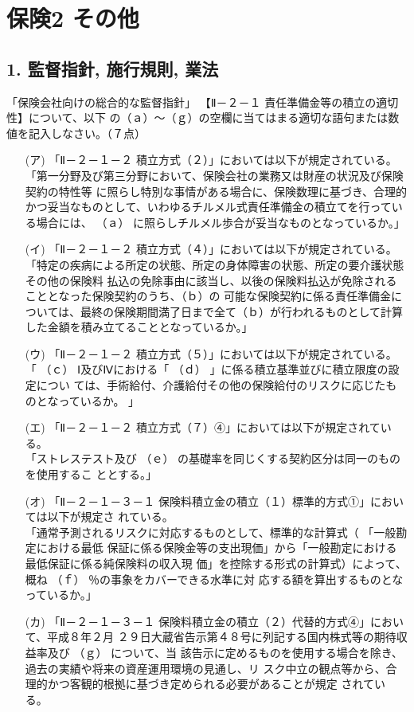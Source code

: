 \documentclass[report,gutter=10mm,fore-edge=10mm,uplatex,dvipdfmx]{jlreq}
\begin{document}
\chapter{保険2 その他}
\section{1. 監督指針, 施行規則, 業法}


「保険会社向けの総合的な監督指針」
【Ⅱ－２－１ 責任準備金等の積立の適切性】について、以下
の（ａ）～（ｇ）の空欄に当てはまる適切な語句または数値を記入しなさい。（７点）

\begin{itemize}
 \item [(ア)]「Ⅱ－２－１－２ 積立方式（２）」においては以下が規定されている。\\
「第一分野及び第三分野において、保険会社の業務又は財産の状況及び保険契約の特性等
に照らし特別な事情がある場合に、保険数理に基づき、合理的かつ妥当なものとして、いわゆるチルメル式責任準備金の積立てを行っている場合には、 （ａ） に照らしチルメル歩合が妥当なものとなっているか。」
 \item [(イ)]「Ⅱ－２－１－２ 積立方式（４）」においては以下が規定されている。\\
「特定の疾病による所定の状態、所定の身体障害の状態、所定の要介護状態その他の保険料
払込の免除事由に該当し、以後の保険料払込が免除されることとなった保険契約のうち、（ｂ）の
可能な保険契約に係る責任準備金については、最終の保険期間満了日まで全て（ｂ）が行われるものとして計算した金額を積み立てることとなっているか。」
\item[(ウ)]「Ⅱ－２－１－２ 積立方式（５）」においては以下が規定されている。\\
「 （ｃ） Ⅰ及びⅣにおける「 （ｄ） 」に係る積立基準並びに積立限度の設定につい
ては、手術給付、介護給付その他の保険給付のリスクに応じたものとなっているか。
」
\item[(エ)]「Ⅱ－２－１－２ 積立方式（７）④」においては以下が規定されている。\\
「ストレステスト及び （ｅ） の基礎率を同じくする契約区分は同一のものを使用するこ
ととする。」
\item[(オ)]「Ⅱ－２－１－３－１ 保険料積立金の積立（１）標準的方式①」においては以下が規定さ
れている。\\
「通常予測されるリスクに対応するものとして、標準的な計算式（
「一般勘定における最低
保証に係る保険金等の支出現価」から「一般勘定における最低保証に係る純保険料の収入現
価」を控除する形式の計算式）によって、概ね （ｆ） ％の事象をカバーできる水準に対
応する額を算出するものとなっているか。」
\item[(カ)]「Ⅱ－２－１－３－１ 保険料積立金の積立（２）代替的方式④」において、平成８年２月
２９日大蔵省告示第４８号に列記する国内株式等の期待収益率及び （ｇ） について、当
該告示に定めるものを使用する場合を除き、過去の実績や将来の資産運用環境の見通し、リ
スク中立の観点等から、合理的かつ客観的根拠に基づき定められる必要があることが規定
されている。
\end{itemize}
\end{document}
